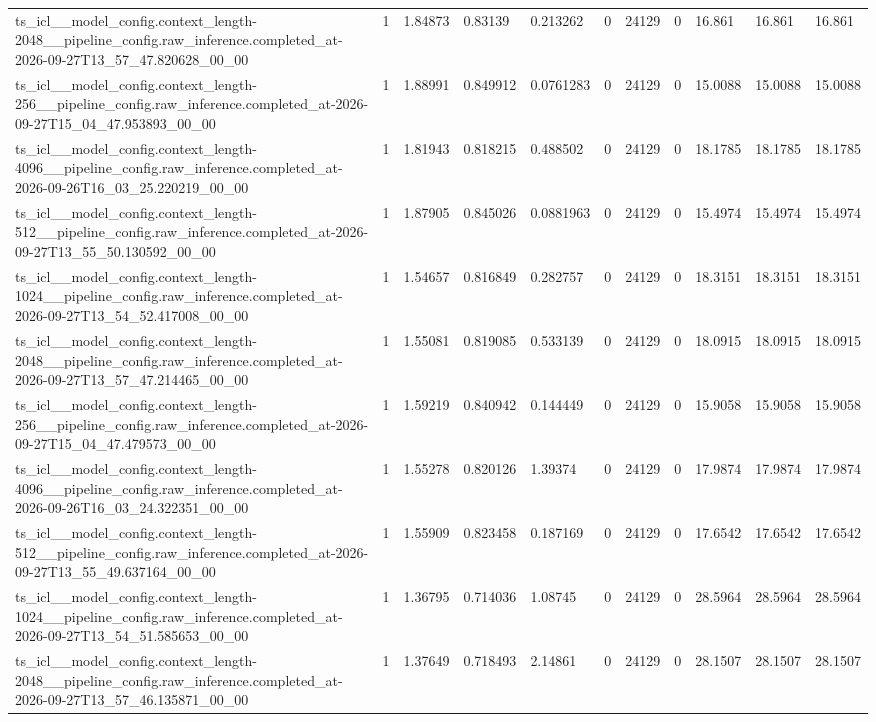 \begin{tabular}{lllllllllll}
ts\_icl\_\_model\_config.context\_length-2048\_\_pipeline\_config.raw\_inference.completed\_at-2026-09-27T13\_57\_47.820628\_00\_00 & 1 & 1.84873 & 0.83139 & 0.213262 & 0 & 24129 & 0 & 16.861 & 16.861 & 16.861 \\
ts\_icl\_\_model\_config.context\_length-256\_\_pipeline\_config.raw\_inference.completed\_at-2026-09-27T15\_04\_47.953893\_00\_00 & 1 & 1.88991 & 0.849912 & 0.0761283 & 0 & 24129 & 0 & 15.0088 & 15.0088 & 15.0088 \\
ts\_icl\_\_model\_config.context\_length-4096\_\_pipeline\_config.raw\_inference.completed\_at-2026-09-26T16\_03\_25.220219\_00\_00 & 1 & 1.81943 & 0.818215 & 0.488502 & 0 & 24129 & 0 & 18.1785 & 18.1785 & 18.1785 \\
ts\_icl\_\_model\_config.context\_length-512\_\_pipeline\_config.raw\_inference.completed\_at-2026-09-27T13\_55\_50.130592\_00\_00 & 1 & 1.87905 & 0.845026 & 0.0881963 & 0 & 24129 & 0 & 15.4974 & 15.4974 & 15.4974 \\
ts\_icl\_\_model\_config.context\_length-1024\_\_pipeline\_config.raw\_inference.completed\_at-2026-09-27T13\_54\_52.417008\_00\_00 & 1 & 1.54657 & 0.816849 & 0.282757 & 0 & 24129 & 0 & 18.3151 & 18.3151 & 18.3151 \\
ts\_icl\_\_model\_config.context\_length-2048\_\_pipeline\_config.raw\_inference.completed\_at-2026-09-27T13\_57\_47.214465\_00\_00 & 1 & 1.55081 & 0.819085 & 0.533139 & 0 & 24129 & 0 & 18.0915 & 18.0915 & 18.0915 \\
ts\_icl\_\_model\_config.context\_length-256\_\_pipeline\_config.raw\_inference.completed\_at-2026-09-27T15\_04\_47.479573\_00\_00 & 1 & 1.59219 & 0.840942 & 0.144449 & 0 & 24129 & 0 & 15.9058 & 15.9058 & 15.9058 \\
ts\_icl\_\_model\_config.context\_length-4096\_\_pipeline\_config.raw\_inference.completed\_at-2026-09-26T16\_03\_24.322351\_00\_00 & 1 & 1.55278 & 0.820126 & 1.39374 & 0 & 24129 & 0 & 17.9874 & 17.9874 & 17.9874 \\
ts\_icl\_\_model\_config.context\_length-512\_\_pipeline\_config.raw\_inference.completed\_at-2026-09-27T13\_55\_49.637164\_00\_00 & 1 & 1.55909 & 0.823458 & 0.187169 & 0 & 24129 & 0 & 17.6542 & 17.6542 & 17.6542 \\
ts\_icl\_\_model\_config.context\_length-1024\_\_pipeline\_config.raw\_inference.completed\_at-2026-09-27T13\_54\_51.585653\_00\_00 & 1 & 1.36795 & 0.714036 & 1.08745 & 0 & 24129 & 0 & 28.5964 & 28.5964 & 28.5964 \\
ts\_icl\_\_model\_config.context\_length-2048\_\_pipeline\_config.raw\_inference.completed\_at-2026-09-27T13\_57\_46.135871\_00\_00 & 1 & 1.37649 & 0.718493 & 2.14861 & 0 & 24129 & 0 & 28.1507 & 28.1507 & 28.1507 \\

\end{tabular}
